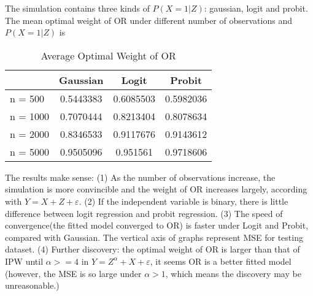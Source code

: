 \documentclass{elegantpaper}
\begin{document}
The simulation contains three kinds of $P(X=1 | Z)$: gaussian, logit and probit. The mean optimal weight of OR under different number of observations and $P(X=1 | Z)$ is
\bigskip

\begin{table}[!htbp]
  \small
  \centering
  \caption{Average Optimal Weight of OR}
    \begin{tabular}{llll}
    \toprule
           & \multicolumn{1}{c}{Gaussian} & \multicolumn{1}{c}{Logit} & \multicolumn{1}{c}{Probit}\\
    \midrule
    n = 500 & \multicolumn{1}{c}{ 0.5443383} & \multicolumn{1}{c}{0.6085503} & \multicolumn{1}{c}{0.5982036}\\
    n = 1000 & \multicolumn{1}{c}{0.7070444} & \multicolumn{1}{c}{ 0.8213404} & \multicolumn{1}{c}{ 0.8078634}\\
    n = 2000 & \multicolumn{1}{c}{0.8346533} & \multicolumn{1}{c}{0.9117676} & \multicolumn{1}{c}{0.9143612}\\
    n = 5000 & \multicolumn{1}{c}{0.9505096} & \multicolumn{1}{c}{0.951561} & \multicolumn{1}{c}{0.9718606}\\
    \midrule
    \end{tabular}%
  \label{tab:reg}%
\end{table}%

The results make sense: (1) As the number of observations increase, the simulation is more convincible and the weight of OR increases largely, according with $Y = X + Z + \varepsilon $. (2) If the independent variable is binary, there is little difference between logit regression and probit regression. (3) The speed of convergence(the fitted model converged to OR) is faster under Logit and Probit, compared with Gaussian. 
The vertical axis of graphs represent MSE for testing dataset. (4) Further discovery: the optimal weight of OR is larger than that of IPW until $\alpha >= 4$ in $Y = Z^\alpha + X + \varepsilon$, it seems OR is a better fitted model (however, the MSE is so large under $\alpha > 1$, which means the discovery may be unreasonable.)
\end{document}
